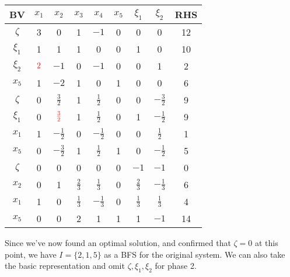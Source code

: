 \documentclass[a4paper, 12pt]{article}
\newcommand{\red}[1]{\textcolor{red}{#1}}
\begin{document}
                \begin{center}
                    \begin{tabular}{c|ccccccc|c}
                        BV & $x_1$ & $x_2$ & $x_3$ & $x_4$ & $x_5$ & $\xi_1$ & $\xi_2$ & RHS \\
                        \hline
                        $\zeta$ & 3 & 0 & 1 & $-1$ & 0 & 0 & 0 & 12 \\
                        $\xi_1$ & 1 & 1 & 1 & 0 & 0 & 1 & 0 & 10 \\
                        $\xi_2$ & $\red{2}$ & $-1$ & 0 & $-1$ & 0 & 0 & 1 & 2 \\
                        $x_5$ & 1 & $-2$ & 1 & 0 & 1 & 0 & 0 & 6 \\
                        \hline
                        $\zeta$ & 0 & $\frac{3}{2}$ & 1 & $\frac{1}{2}$ & 0 & 0 & $-\frac{3}{2}$ & 9 \\
                        $\xi_1$ & 0 & $\red{\frac{3}{2}}$ & 1 & $\frac{1}{2}$ & 0 & 1 & $-\frac{1}{2}$ & 9 \\
                        $x_1$ & 1 & $-\frac{1}{2}$ & 0 & $-\frac{1}{2}$ & 0 & 0 & $\frac{1}{2}$ & 1 \\
                        $x_5$ & 0 & $-\frac{3}{2}$ & 1 & $\frac{1}{2}$ & 1 & 0 & $-\frac{1}{2}$ & 5 \\
                        \hline
                        $\zeta$ & 0 & 0 & 0 & 0 & 0 & $-1$ & $-1$ & 0 \\
                        $x_2$ & 0 & 1 & $\frac{2}{3}$ & $\frac{1}{3}$ & 0 & $\frac{2}{3}$ & $-\frac{1}{3}$ & 6 \\
                        $x_1$ & 1 & 0 & $\frac{1}{3}$ & $-\frac{1}{3}$ & 0 & $\frac{1}{3}$ & $\frac{1}{3}$ & 4 \\
                        $x_5$ & 0 & 0 & 2 & 1 & 1 & 1 & $-1$ & 14
                    \end{tabular}
                \end{center}
                Since we've now found an optimal solution, and confirmed that $\zeta = 0$ at this point, we have $I = \{2, 1, 5\}$ as a BFS for the original system.
                We can also take the basic representation and omit $\zeta, \xi_1, \xi_2$ for phase 2.
\end{document}
